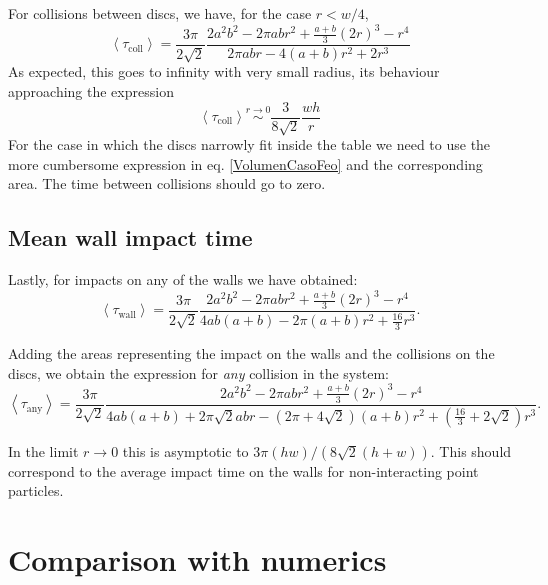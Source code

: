 \documentclass[superscriptaddress,pre,reprint,showpacs,onecolumn]{revtex4-1}
\newcommand{\mean}[1]{\left \langle #1 \right \rangle}
\begin{document}
For collisions between discs, we have, for the case $r<w/4$,
\begin{equation}\label{colltau}
 \mean{\tau_\text{coll}} = 	
\frac{3 \pi}{2\sqrt{2}}
\frac {2 a^{2} b^{2}  - 2 \pi a b r^{2} + \textstyle \frac{a+b}{3}  (2r)^{3}  -  r^4}
{2\pi a b r -4(a+b)r^2+2r^3}
\end{equation}
As expected, this goes to infinity with very small radius, its behaviour
approaching the expression
\begin{equation}\label{colltaulim0}
\mean{\tau_\text{coll}} \overset{r \to 0}{\sim}
\frac{3}{8\sqrt{2}}\frac{wh}{r}
\end{equation}
For the case in which the discs narrowly fit inside the table we need to
use the more cumbersome expression in eq. \ref{VolumenCasoFeo} and
the corresponding area. The time between collisions should go to zero.


\subsection{Mean wall impact time}

Lastly, for impacts on any of the walls we have obtained: 
\begin{equation}\label{impactwall}
 \mean{\tau_\text{wall}} = 	
\frac{3 \pi}{2\sqrt{2}}
\frac { 2a^{2} b^{2}  -  2\pi a b r^{2} + \frac{a+b}{3}(2r)^3 - r^4}
{4ab(a+b)-2\pi(a+b) r^2 + \frac{16}{3} r^3 }.
\end{equation}

Adding the areas representing the impact on the walls and
the collisions on the discs, we  obtain
the expression for \emph{any} 
collision in the system:
\begin{equation}\label{impactany}
 \mean{\tau_\text{any}} = 	
\frac{3 \pi}{2\sqrt{2}}
\frac { 2a^{2} b^{2}  -  2\pi a b r^{2} + \frac{a+b}{3}(2r)^3 - r^4}
{4ab(a+b)+2 \pi \sqrt{2} abr-(2\pi+4\sqrt{2})(a+b)r^2+(\frac{16}{3}+2\sqrt{2})r^3}.
\end{equation}

In the limit $r\rightarrow 0$ this is asymptotic to $3 \pi (hw)/(8\sqrt{2}(h+w))$.
This should correspond to the average impact time on the walls
for non-interacting point particles.


\section{Comparison with numerics}
\end{document}
